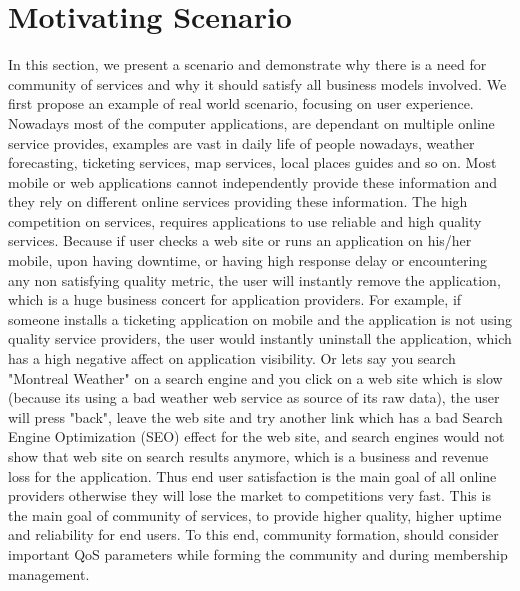 
\section{Motivating Scenario}\label{sec:motexample}

In this section, we present a scenario and demonstrate why there is a need for community of services and why it should satisfy all business models involved. 
We first propose an example of real world scenario, focusing on user experience. Nowadays most of the computer applications, are dependant on multiple online 
service provides, examples are vast in daily life of people nowadays, weather forecasting, ticketing services, map services, local places guides and so on. Most mobile or web applications 
cannot independently provide these information and they rely on different online services providing these information. 
The high competition on services, requires applications to use reliable and high quality services. 
Because if user checks a web site or runs an application on his/her mobile, upon having downtime, or having high response delay or encountering any non satisfying quality metric, the user
will instantly remove the application, which is a huge business concert for application providers. For example, if someone installs a ticketing application on mobile and the application is not using quality service providers, the user would instantly uninstall the application, which has a high negative affect on application visibility. Or lets say you search "Montreal Weather" on a search engine and you click on a web site which is slow (because its using a bad weather web service as source of its raw data), the user will press "back", leave the web site and try another link which has a bad Search Engine Optimization (SEO) effect for the web site, and search engines would not show that web site on search results anymore, which is a business and revenue loss for the application. Thus end user satisfaction is the main goal of all online providers otherwise they will lose the market to competitions very fast. This is the main goal of community of services, to provide higher quality, higher uptime and reliability for end users. To this end, community formation, should consider important QoS parameters while forming the community and during membership management.

